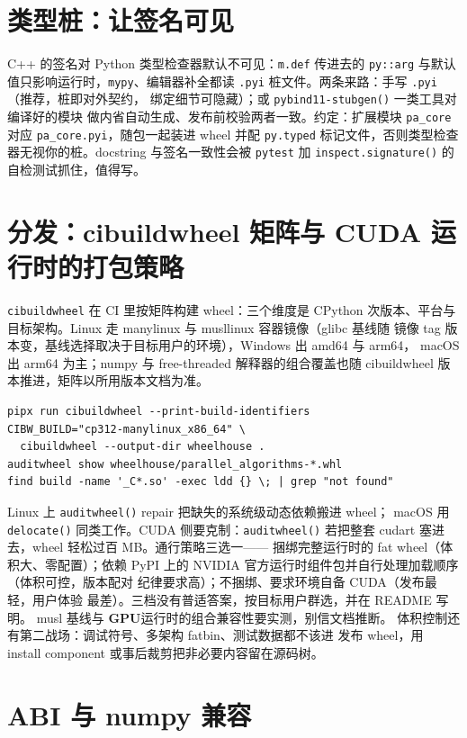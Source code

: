 \documentclass[12pt,a4paper,fontset=fandol]{ctexbook}
\newcommand{\Fn}[1]{\texttt{#1()}}
\newcommand{\Tp}[1]{\texttt{#1}}
\newcommand{\Dom}[1]{\textsf{\bfseries #1}}
\newcommand{\GPU}{\Dom{GPU}}
\begin{document}
\section{类型桩：让签名可见}

C++ 的签名对 Python 类型检查器默认不可见：\Tp{m.def} 传进去的
\Tp{py::arg} 与默认值只影响运行时，\Tp{mypy}、编辑器补全都读
\Tp{.pyi} 桩文件。两条来路：手写 \Tp{.pyi}（推荐，桩即对外契约，
绑定细节可隐藏）；或 \Fn{pybind11-stubgen} 一类工具对编译好的模块
做内省自动生成、发布前校验两者一致。约定：扩展模块 \Tp{pa\_core}
对应 \Tp{pa\_core.pyi}，随包一起装进 wheel 并配 \Tp{py.typed}
标记文件，否则类型检查器无视你的桩。docstring 与签名一致性会被
\Tp{pytest} 加 \Fn{inspect.signature} 的自检测试抓住，值得写。

\section{分发：cibuildwheel 矩阵与 CUDA 运行时的打包策略}

\Tp{cibuildwheel} 在 CI 里按矩阵构建 wheel：三个维度是 CPython
次版本、平台与目标架构。Linux 走 manylinux 与 musllinux 容器镜像（glibc 基线随
镜像 tag 版本变，基线选择取决于目标用户的环境），Windows 出 amd64 与 arm64，
macOS 出 arm64 为主；numpy 与 free-threaded 解释器的组合覆盖也随
cibuildwheel 版本推进，矩阵以所用版本文档为准。

\begin{lstlisting}[style=shellstyle,caption={本地触发一个切片并检查产物}]
pipx run cibuildwheel --print-build-identifiers
CIBW_BUILD="cp312-manylinux_x86_64" \
  cibuildwheel --output-dir wheelhouse .
auditwheel show wheelhouse/parallel_algorithms-*.whl
find build -name '_C*.so' -exec ldd {} \; | grep "not found"
\end{lstlisting}

Linux 上 \Fn{auditwheel} repair 把缺失的系统级动态依赖搬进 wheel；
macOS 用 \Fn{delocate} 同类工作。CUDA 侧要克制：\Fn{auditwheel}
若把整套 cudart 塞进去，wheel 轻松过百 MB。通行策略三选一——
捆绑完整运行时的 fat wheel（体积大、零配置）；依赖 PyPI 上的
NVIDIA 官方运行时组件包并自行处理加载顺序（体积可控，版本配对
纪律要求高）；不捆绑、要求环境自备 CUDA（发布最轻，用户体验
最差）。三档没有普适答案，按目标用户群选，并在 README 写明。
musl 基线与 \GPU{}运行时的组合兼容性要实测，别信文档推断。
体积控制还有第二战场：调试符号、多架构 fatbin、测试数据都不该进
发布 wheel，用 install component 或事后裁剪把非必要内容留在源码树。

\section{ABI 与 numpy 兼容}
\end{document}
